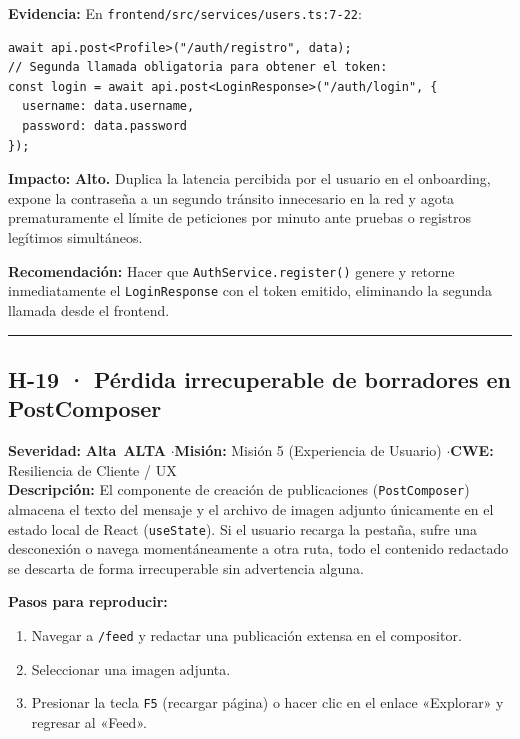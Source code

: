 \documentclass[10pt,a4paper]{article}
\newcommand{\code}[1]{\nolinkurl{#1}}
\newcommand{\badgeAlta}{\colorbox{orange!20}{\textcolor{orange!90!black}{\textbf{\footnotesize Alta}}}}
\begin{document}
\noindent\textbf{Evidencia:}
En \code{frontend/src/services/users.ts:7-22}:
\begin{tcolorbox}[colback=codebg,colframe=gray!40,arc=1mm]\small
\begin{verbatim}
await api.post<Profile>("/auth/registro", data);
// Segunda llamada obligatoria para obtener el token:
const login = await api.post<LoginResponse>("/auth/login", {
  username: data.username,
  password: data.password
});
\end{verbatim}
\end{tcolorbox}

\noindent\textbf{Impacto:}
\textbf{Alto.} Duplica la latencia percibida por el usuario en el onboarding, expone la contraseña a un segundo tránsito innecesario en la red y agota prematuramente el límite de peticiones por minuto ante pruebas o registros legítimos simultáneos.

\noindent\textbf{Recomendación:}
Hacer que \code{AuthService.register()} genere y retorne inmediatamente el \code{LoginResponse} con el token emitido, eliminando la segunda llamada desde el frontend.

\vspace{0.8em}
\hrule
\vspace{0.8em}

\subsection{H-19 · Pérdida irrecuperable de borradores en PostComposer}
\noindent\textbf{Severidad:} \badgeAlta\ \textbf{ALTA} \quad$\cdot$\quad \textbf{Misión:} Misión 5 (Experiencia de Usuario) \quad$\cdot$\quad \textbf{CWE:} Resiliencia de Cliente / UX\\[0.3em]

\noindent\textbf{Descripción:}
El componente de creación de publicaciones (\code{PostComposer}) almacena el texto del mensaje y el archivo de imagen adjunto únicamente en el estado local de React (\code{useState}). Si el usuario recarga la pestaña, sufre una desconexión o navega momentáneamente a otra ruta, todo el contenido redactado se descarta de forma irrecuperable sin advertencia alguna.

\noindent\textbf{Pasos para reproducir:}
\begin{enumerate}[leftmargin=*]
    \item Navegar a \code{/feed} y redactar una publicación extensa en el compositor.
    \item Seleccionar una imagen adjunta.
    \item Presionar la tecla \code{F5} (recargar página) o hacer clic en el enlace «Explorar» y regresar al «Feed».
\end{enumerate}
\end{document}
